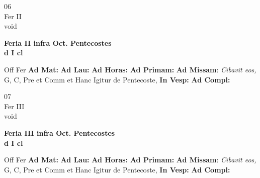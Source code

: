 \documentclass[10pt, openany]{book}
\begin{document}
    \begin{center}
        \begin{minipage}{3.5in}
            \vspace{2em}
            \begin{minipage}{0.5in}
                {\Huge 06} \\
                {\normalsize Fer II} \\
                {\normalsize void}
            \end{minipage}
            \begin{minipage}{3.0in}
                \textbf{ \large Feria II infra Oct. Pentecostes \\
                \textnormal{\normalsize d I cl}} \\ 
            \end{minipage}
            \begin{justify}Off Fer
                \textbf{Ad Mat: }
                \textbf{Ad Lau: }
                \textbf{Ad Horas: }
                \textbf{Ad Primam: }\textbf{Ad Missam}: \textit{Cibavit eos,} G, C, Pre et Comm et Hanc Igitur de Pentecoste,  
                \textbf{In Vesp: }
                \textbf{Ad Compl: }
            \end{justify}
        \end{minipage}
    \end{center}

    \begin{center}
        \begin{minipage}{3.5in}
            \vspace{2em}
            \begin{minipage}{0.5in}
                {\Huge 07} \\
                {\normalsize Fer III} \\
                {\normalsize void}
            \end{minipage}
            \begin{minipage}{3.0in}
                \textbf{ \large Feria III infra Oct. Pentecostes \\
                \textnormal{\normalsize d I cl}} \\ 
            \end{minipage}
            \begin{justify}Off Fer
                \textbf{Ad Mat: }
                \textbf{Ad Lau: }
                \textbf{Ad Horas: }
                \textbf{Ad Primam: }\textbf{Ad Missam}: \textit{Cibavit eos,} G, C, Pre et Comm et Hanc Igitur de Pentecoste,  
                \textbf{In Vesp: }
                \textbf{Ad Compl: }
            \end{justify}
        \end{minipage}
    \end{center}
\end{document}
